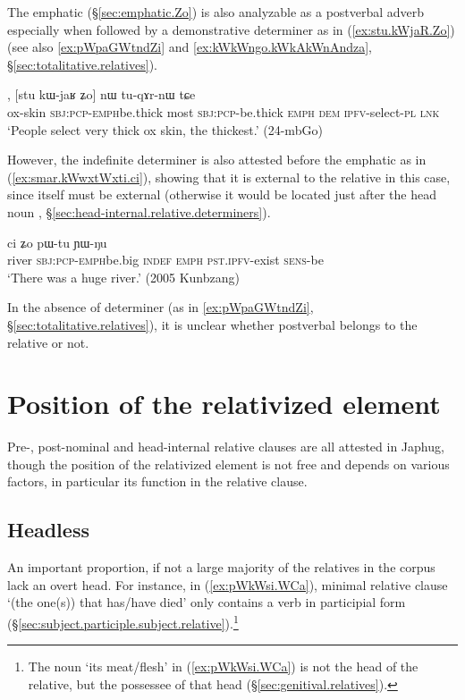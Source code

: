 The emphatic  (§\ref{sec:emphatic.Zo}) is also analyzable as a postverbal adverb especially when followed by a demonstrative determiner as in (\ref{ex:stu.kWjaR.Zo}) (see also \ref{ex:pWpaGWtndZi} and \ref{ex:kWkWngo.kWkAkWnAndza}, §\ref{sec:totalitative.relatives}).

\begin{exe}
\ex \label{ex:stu.kWjaR.Zo}
, [stu kɯ-jaʁ ʑo] nɯ tu-qɤr-nɯ tɕe \\
ox-skin \textsc{sbj}:\textsc{pcp}-\textsc{emph}\redp{}be.thick most \textsc{sbj}:\textsc{pcp}-be.thick \textsc{emph} \textsc{dem} \textsc{ipfv}-select-\textsc{pl} \textsc{lnk} \\
\glt `People select very thick ox skin, the thickest.' (24-mbGo)
\end{exe} 

However, the indefinite determiner  is also attested before the emphatic  as in (\ref{ex:smar.kWwxtWxti.ci}), showing that it is external to the relative in this case, since  itself must be external (otherwise it would be located just after the head noun , §\ref{sec:head-internal.relative.determiners}).

\begin{exe}
\ex \label{ex:smar.kWwxtWxti.ci}
 ci ʑo pɯ-tu ɲɯ-ŋu \\
river \textsc{sbj}:\textsc{pcp}-\textsc{emph}\redp{}be.big \textsc{indef} \textsc{emph} \textsc{pst}.\textsc{ipfv}-exist \textsc{sens}-be \\
\glt `There was a huge river.' (2005 Kunbzang)
\end{exe} 

In the absence of determiner (as in \ref{ex:pWpaGWtndZi}, §\ref{sec:totalitative.relatives}), it is unclear whether postverbal  belongs to the relative or not.

\section{Position of the relativized element} \label{sec:position.head.relative}
Pre-, post-nominal and head-internal relative clauses are all attested in Japhug, though the position of the relativized element is not free and depends on various factors, in particular its function in the relative clause.

\subsection{Headless} \label{sec:headless.relative}
An important proportion, if not a large majority of the relatives in the corpus lack an overt head. For instance, in (\ref{ex:pWkWsi.WCa}), minimal relative clause  `(the one(s)) that has/have died' only contains a verb in participial form (§\ref{sec:subject.participle.subject.relative}).\footnote{The noun  `its meat/flesh' in (\ref{ex:pWkWsi.WCa}) is not the head of the relative, but the possessee of that head (§\ref{sec:genitival.relatives}). }


